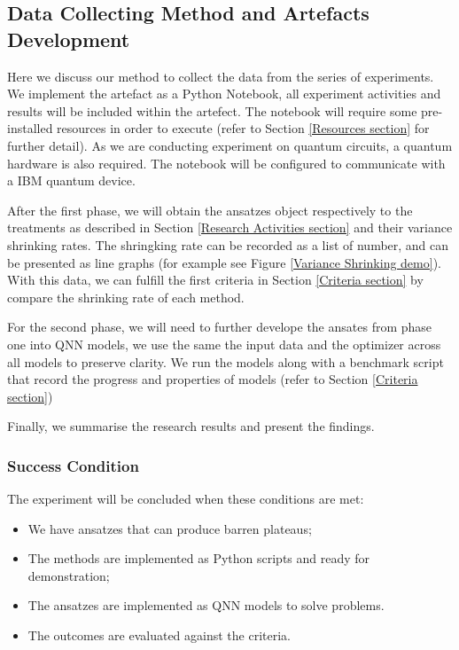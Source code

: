 \subsection{Data Collecting Method and Artefacts Development}
\label{Data Collecting Section}
Here we discuss our method to collect the data from the series of experiments.
We implement the artefact as a Python Notebook, all experiment activities and results will be included within the artefect.
The notebook will require some pre-installed resources in order to execute (refer to Section \ref{Resources section} for further detail).
As we are conducting experiment on quantum circuits, a quantum hardware is also required.
The notebook will be configured to communicate with a IBM quantum device.

After the first phase, we will obtain the ansatzes object respectively to the treatments as described in Section \ref{Research Activities section} and their variance shrinking rates.
The shringking rate can be recorded as a list of number, and can be presented as line graphs (for example see Figure \ref{Variance Shrinking demo}).
With this data, we can fulfill the first criteria in Section \ref{Criteria section} by compare the shrinking rate of each method.

For the second phase, we will need to further develope the ansates from phase one into QNN models, we use the same the input data and the optimizer across all models to preserve clarity.
We run the models along with a benchmark script that record the progress and properties of models (refer to Section \ref{Criteria section})

Finally, we summarise the research results and present the findings.

\subsubsection{Success Condition}
The experiment will be concluded when these conditions are met:
\begin{itemize}
    \item We have ansatzes that can produce barren plateaus;
    \item The methods are implemented as Python scripts and ready for demonstration;
    \item The ansatzes are implemented as QNN models to solve problems.
    \item The outcomes are evaluated against the criteria.
\end{itemize}